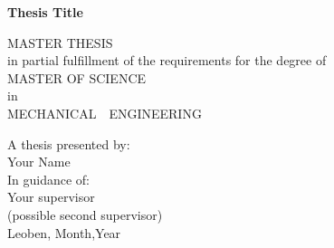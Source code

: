 \begin{titlepage}
	\begin{center}
		\vspace*{1cm}
		
		\Huge
		\textbf{Thesis Title}
		
		\vspace{2cm}
		
		
		\LARGE M\Large \;A\;S\;T\;E\;R\;\; \LARGE T\Large\;H\;E\;S\;I\;S \\
		\vspace{0.4cm}
		\normalsize
		in partial fulfillment of the requirements for the degree of  \\
		\vspace{0.4cm}
		\LARGE M\Large \;A\;S\;T\;E\;R \;\; O\;F \;\;\LARGE S\Large \;C\;I\;E\;N\;C\;E \\
		\vspace{0.4cm}
		\normalsize
		in\\
		\vspace{0.4cm}
		\LARGE M\Large \;E\;C\;H\;A\;N\;I\;C\;A\;L \,\, \LARGE E\Large \;N\;G\;I\;N\;E\;E\;R\;I\;N\;G\\ 
		\vspace{1.2cm}
	\end{center}    

	\begin{flushleft}
		\small
		A thesis presented by: \\
		\vspace{0.2cm}
		\normalsize 
		\qquad Your Name\\ 
		\vspace{0.5cm}
		\small 
		In guidance of:  \\
		\vspace{0.2cm}
		\normalsize 
		\qquad Your  supervisor \\ 
		\vspace{0.2cm}
	    \qquad (possible second supervisor) \\
		\vspace{1cm}
		\small 
		Leoben, Month,Year
	\end{flushleft} 
\end{titlepage}
